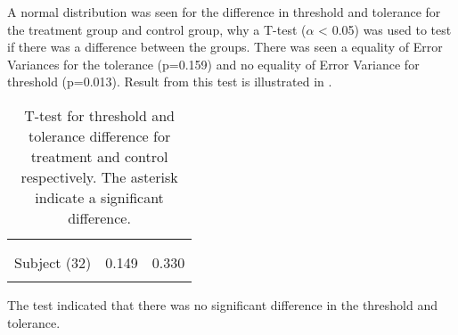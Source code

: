 A normal distribution was seen for the difference in threshold and tolerance for the treatment group and control group, why a T-test ($\alpha$ < 0.05) was used to test if there was a difference between the groups. 
There was seen a equality of Error Variances for the tolerance (p=0.159) and no equality of Error Variance for threshold (p=0.013).
Result from this test is illustrated in .

\begin{longtable} {l|c|c}
 \rowcolor[HTML]{C0C0C0} 
  \color[HTML]{000000}{} & 
 \multicolumn{1}{c|}{ \color[HTML]{000000}{\textbf{Threshold}}} & \multicolumn{1}{c}{ \color[HTML]{000000}{\textbf{Tolerance}}}  	\\  \rule{0pt}{3ex} 
  \cellcolor[HTML]{C0C0C0}{} &
 \multicolumn{1}{c|}{ \cellcolor[HTML]{C0C0C0}{Difference }} & \multicolumn{1}{|c}{ \cellcolor[HTML]{C0C0C0}{Difference}}  	\\ \hline
Subject (32) & 0.149 & 0.330  \\ \hline
	\caption{T-test for threshold and tolerance difference for treatment and control respectively. The asterisk indicate a significant difference.}	\label{tab:T-test1}
\end{longtable}
\vspace{-.5cm}

The test indicated that there was no significant difference in the threshold and tolerance.

